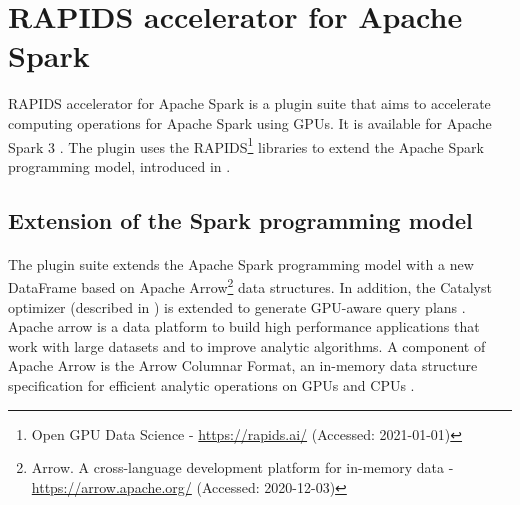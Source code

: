 \section{RAPIDS accelerator for Apache Spark}
\label{sec:04_rapids}
RAPIDS accelerator for Apache Spark is a plugin suite that aims to accelerate computing operations for Apache Spark using GPUs. It is available for Apache Spark 3 \cite{SparkRapids2020Docs}.
The plugin uses the RAPIDS\footnote{Open GPU Data Science - \url{https://rapids.ai/} (Accessed: 2021-01-01)} libraries to extend the Apache Spark programming model, introduced in  \cite{SparkRapids2020Docs, Mcdonald2020SparkRapids}.


\subsection{Extension of the Spark programming model}
\label{subsec:04_rapids_ext}
\paragraph{}The plugin suite extends the Apache Spark programming model with a new DataFrame based on Apache Arrow\footnote{Arrow. A cross-language development platform for in-memory data - \url{https://arrow.apache.org/} (Accessed: 2020-12-03)} data structures. In addition, the Catalyst optimizer (described in ) is extended to generate GPU-aware query plans \cite{Mcdonald2020SparkRapids}.
Apache arrow is a data platform to build high performance applications that work with large datasets and to improve analytic algorithms. A component of Apache Arrow is the Arrow Columnar Format, an in-memory data structure specification for efficient analytic operations on GPUs and CPUs \cite{ApacheArrow2020Docs}.


